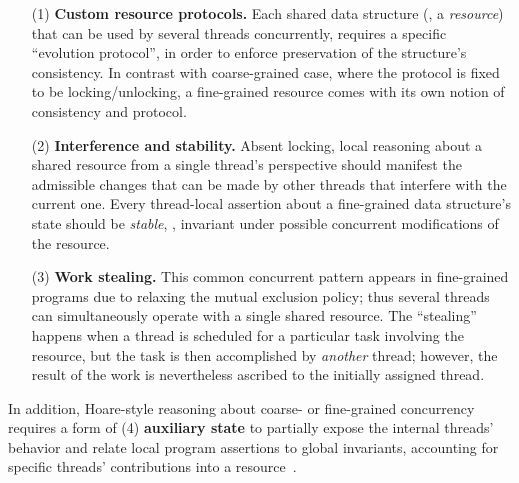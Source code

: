 \begin{itemize}[itemindent=0pt] 

\item[(1)] \textbf{Custom resource protocols.} Each shared data
  structure (\ie, a \emph{resource}) that can be used by several
  threads concurrently, requires a specific ``evolution protocol'', in
  order to enforce preservation of the structure's consistency.
% 
  In contrast with coarse-grained case, where the protocol is fixed to
  be locking/unlocking, a fine-grained resource comes with its own
  notion of consistency and protocol.
  
\item[(2)] \textbf{Interference and stability.} Absent locking, local reasoning
  about a shared resource from a single thread's perspective should manifest
  the admissible changes that
  can be made by other threads that interfere with the current one. Every thread-local assertion about a fine-grained data structure's state 
  should be \emph{stable}, \ie, invariant under possible concurrent
  modifications of the resource.
%

\item[(3)] \textbf{Work stealing.} This common concurrent pattern
  appears in fine-grained programs due to relaxing the {mutual
    exclusion} policy; thus several threads can simultaneously operate
  with a single shared resource. The ``stealing'' happens when a
  thread is scheduled for a particular task involving the resource,
  but the task is then accomplished by \emph{another} thread; however,
  the result of the work is nevertheless ascribed to the initially
  assigned thread.
%
%

\end{itemize}
%
\noindent
%
In addition, Hoare-style reasoning about coarse- or fine-grained
concurrency requires a form of (4) \textbf{auxiliary state} to
partially expose the internal threads' behavior and relate local
program assertions to global invariants, accounting for specific
threads' contributions into a resource~\cite{Jones:TR09}.
%

